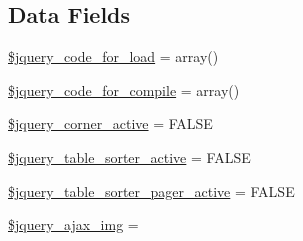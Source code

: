 \subsection*{Data Fields}
\begin{DoxyCompactItemize}
\item 
\mbox{\hyperlink{class_c_i___jquery_aae273040292e1e032140a014d38f6f0c}{\$jquery\+\_\+code\+\_\+for\+\_\+load}} = array()
\item 
\mbox{\hyperlink{class_c_i___jquery_a807e6910954f1e8e354f7eb16332af3c}{\$jquery\+\_\+code\+\_\+for\+\_\+compile}} = array()
\item 
\mbox{\hyperlink{class_c_i___jquery_a86584cd6fadb4fe08bc8cf65d98da4f3}{\$jquery\+\_\+corner\+\_\+active}} = F\+A\+L\+SE
\item 
\mbox{\hyperlink{class_c_i___jquery_a29e31c754cf116ca8fb50756b582f3a9}{\$jquery\+\_\+table\+\_\+sorter\+\_\+active}} = F\+A\+L\+SE
\item 
\mbox{\hyperlink{class_c_i___jquery_a43cc145aba3c11e907fb4245f23bc44e}{\$jquery\+\_\+table\+\_\+sorter\+\_\+pager\+\_\+active}} = F\+A\+L\+SE
\item 
\mbox{\hyperlink{class_c_i___jquery_a41fe5a2b111f2b05a95712824ad1e7f4}{\$jquery\+\_\+ajax\+\_\+img}} = \textquotesingle{}\textquotesingle{}
\end{DoxyCompactItemize}

